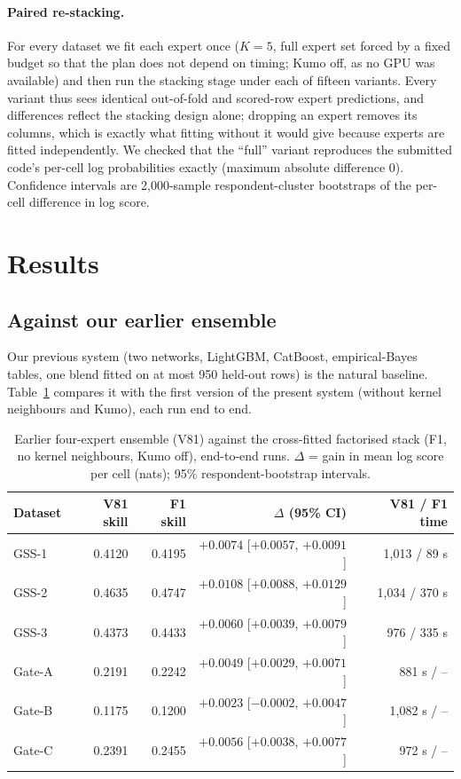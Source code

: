 \documentclass[10pt]{article}
\begin{document}
\paragraph{Paired re-stacking.} For every dataset we fit each expert once ($K=5$, full expert set forced by a fixed budget so that the plan does not depend on timing; Kumo off, as no GPU was available) and then run the stacking stage under each of fifteen variants. Every variant thus sees identical out-of-fold and scored-row expert predictions, and differences reflect the stacking design alone; dropping an expert removes its columns, which is exactly what fitting without it would give because experts are fitted independently. We checked that the ``full'' variant reproduces the submitted code's per-cell log probabilities exactly (maximum absolute difference 0). Confidence intervals are 2,000-sample respondent-cluster bootstraps of the per-cell difference in log score.

\section{Results}
\label{sec:results}

\subsection{Against our earlier ensemble}
Our previous system (two networks, LightGBM, CatBoost, empirical-Bayes tables, one blend fitted on at most 950 held-out rows) is the natural baseline. Table~\ref{tab:v81} compares it with the first version of the present system (without kernel neighbours and Kumo), each run end to end.

\begin{table}[t]
\centering\small
\caption{Earlier four-expert ensemble (V81) against the cross-fitted factorised stack (F1, no kernel neighbours, Kumo off), end-to-end runs. $\Delta$ = gain in mean log score per cell (nats); 95\% respondent-bootstrap intervals.}
\label{tab:v81}
\begin{tabular}{lrrrr}
\toprule
Dataset & V81 skill & F1 skill & $\Delta$ (95\% CI) & V81 / F1 time \\
\midrule
GSS-1 & 0.4120 & 0.4195 & $+0.0074$ [$+0.0057$, $+0.0091$] & 1{,}013 / 89 s \\
GSS-2 & 0.4635 & 0.4747 & $+0.0108$ [$+0.0088$, $+0.0129$] & 1{,}034 / 370 s \\
GSS-3 & 0.4373 & 0.4433 & $+0.0060$ [$+0.0039$, $+0.0079$] & 976 / 335 s \\
Gate-A & 0.2191 & 0.2242 & $+0.0049$ [$+0.0029$, $+0.0071$] & 881 s / -- \\
Gate-B & 0.1175 & 0.1200 & $+0.0023$ [$-0.0002$, $+0.0047$] & 1{,}082 s / -- \\
Gate-C & 0.2391 & 0.2455 & $+0.0056$ [$+0.0038$, $+0.0077$] & 972 s / -- \\
\bottomrule
\end{tabular}
\end{table}
\end{document}
